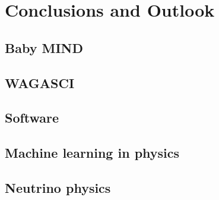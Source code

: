 \chapter{Conclusions and Outlook}
\label{c:conclusion}

\section{Baby MIND}

\section{WAGASCI}

\section{Software}


\section{Machine learning in physics}

\section{Neutrino physics}



